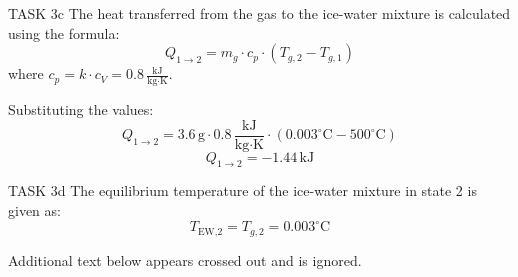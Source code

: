 TASK 3c  
The heat transferred from the gas to the ice-water mixture is calculated using the formula:  
\[
Q_{1 \to 2} = m_g \cdot c_p \cdot (T_{g,2} - T_{g,1})
\]  
where \( c_p = k \cdot c_V = 0.8 \, \frac{\text{kJ}}{\text{kg} \cdot \text{K}} \).  

Substituting the values:  
\[
Q_{1 \to 2} = 3.6 \, \text{g} \cdot 0.8 \, \frac{\text{kJ}}{\text{kg} \cdot \text{K}} \cdot (0.003^\circ\text{C} - 500^\circ\text{C})
\]  
\[
Q_{1 \to 2} = -1.44 \, \text{kJ}
\]  

TASK 3d  
The equilibrium temperature of the ice-water mixture in state 2 is given as:  
\[
T_{\text{EW,2}} = T_{g,2} = 0.003^\circ\text{C}
\]  

Additional text below appears crossed out and is ignored.